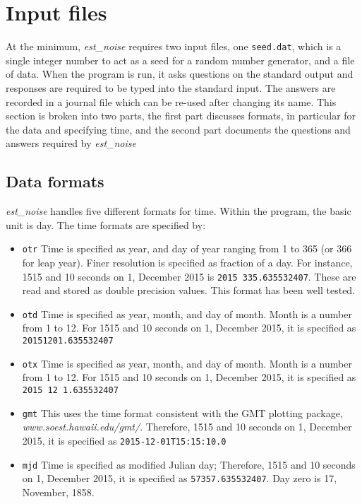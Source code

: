 \documentclass[12pt]{amsart}
\begin{document}
\section{Input files}

At the minimum, \textit{est\_noise} requires two input files, one \texttt{seed.dat}, which is a single integer number
to act as a seed for a random number generator, and a file of data.  When the program is run, it
asks questions on the standard output and responses are required to be typed into the
standard input. The answers are recorded in a journal file which
can be re-used after changing its name. This section is broken into two parts, the first part discusses formats, in particular
for the data and specifying time, and the second part documents the questions and answers required by
\textit{est\_noise}

\subsection{Data formats}

\textit{est\_noise} handles five different formats for time.  Within the program, the basic unit is day.  The time formats
are specified by:
\begin{itemize}
\item \texttt{otr} Time is specified as year, and day of year ranging from 1 to 365 (or 366 for leap year). Finer resolution
is specified as fraction of a day.  For instance, 1515 and 10 seconds on 1, December 2015 is \texttt{2015 335.635532407}. These are read and stored as double precision values. This format has been well tested.
\item \texttt{otd} Time is specified as year, month, and day of month.  Month is a number from 1 to 12. For 
1515 and 10 seconds on 1, December 2015, it is specified as \texttt{20151201.635532407}
\item \texttt{otx} Time is specified as year, month, and day of month.  Month is a number from 1 to 12. For 
1515 and 10 seconds on 1, December 2015, it is specified as \texttt{2015 12 1.635532407}
\item \texttt{gmt} This uses the time format consistent with the GMT plotting package, \textit{www.soest.hawaii.edu/gmt/}.
Therefore, 1515 and 10 seconds on 1, December 2015, it is specified as \texttt{2015-12-01T15:15:10.0}
\item \texttt{mjd} Time is specified as modified Julian day; Therefore, 1515 and 10 seconds on 1, December 2015, it is specified as \texttt{57357.635532407}. Day zero is 17, November, 1858.
\end{itemize}
\end{document}
